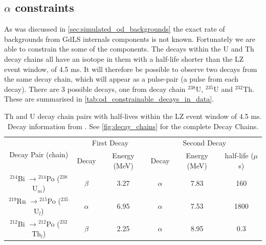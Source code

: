 \subsection{$\alpha$ constraints}
\par
As was discussed in \autoref{sec:simulated_od_backgrounds} the exact rate of backgrounds from GdLS internals components is not known.
Fortunately we are able to constrain the some of the components. 
The decays within the U and Th decay chains all have an isotope in them with a half-life shorter than the LZ event window, of 4.5 ms.
It will therefore be possible to observe two decays from the same decay chain, which will appear as a pulse-pair (a pulse from each decay).
There are 3 possible decays, one from decay chain ${}^{238}$U, ${}^{235}$U and ${}^{232}$Th.
These are summarised in \autoref{tab:od_constrainable_decays_in_data}.

\begin{table}[!htbp]
    \centering
    \begin{tabular}{c|c|c|c|c|c}
        \multirow{2}{*}{Decay Pair (chain)}                    & \multicolumn{2}{c|}{First Decay}   & \multicolumn{3}{c}{Second Decay}    \\ 
                                                               & Decay    & Energy (MeV) & Decay    & Energy (MeV) & half-life ($\mu$s) \\ \hline
        ${}^{214}$Bi $\to {}^{214}$Po (${}^{238}$U$_{m}$)          & $\beta$  & 3.27         & $\alpha$ & 7.83         & 160   \\ 
        ${}^{219}$Rn $\to {}^{215}$Po (${}^{235}$U$_{l}$)          & $\alpha$ & 6.95         & $\alpha$ & 7.53         & 1800  \\ 
        ${}^{212}$Bi $\to {}^{212}$Po (${}^{232}$Th$_{l}$)         & $\beta$  & 2.25         & $\alpha$ & 8.95         & 0.3
    \end{tabular}
    \caption{Th and U decay chain pairs with half-lives within the LZ event window of 4.5 ms. 
             Decay information from \cite{radon_chains_ref}.
             See \autoref{fig:decay_chains} for the complete Decay Chains.}
    \label{tab:od_constrainable_decays_in_data}
\end{table}

